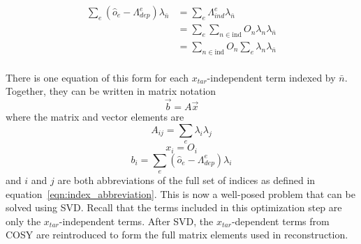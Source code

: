 \begin{align}
    \sum_e (\hat{o}_e - \Lambda^e_{dep}) \lambda_{\bar{n}} &= \sum_e \Lambda^e_{ind} \lambda_{\bar{n}} \\
            &= \sum_e \sum_{n\in\text{ind}} O_n \lambda_n \lambda_{\bar{n}} \\
            &= \sum_{n\in\text{ind}} O_n \sum_e \lambda_n \lambda_{\bar{n}} \\
\end{align}


There is one equation of this form for each $x_{tar}$-independent term indexed
by $\bar{n}$.
Together, they can be written in matrix notation
\begin{equation}
    \vec{b} = A \vec{x}
\end{equation}
where the matrix and vector elements are
\begin{equation}
    A_{ij} = \sum_e \lambda_i \lambda_j
\end{equation}
\begin{equation}
    x_i = O_i
\end{equation}
\begin{equation}
    b_i = \sum_e(\hat{o}_e - \Lambda^e_{dep}) \lambda_i
\end{equation}
and $i$ and $j$ are both abbreviations of the full set of indices as defined in
equation~\ref{eqn:index_abbreviation}.
This is now a well-posed problem that can be solved using SVD.
Recall that the terms included in this optimization step are only the
$x_{tar}$-independent terms.
After SVD, the $x_{tar}$-dependent terms from COSY are reintroduced to form the
full matrix elements used in reconstruction.
